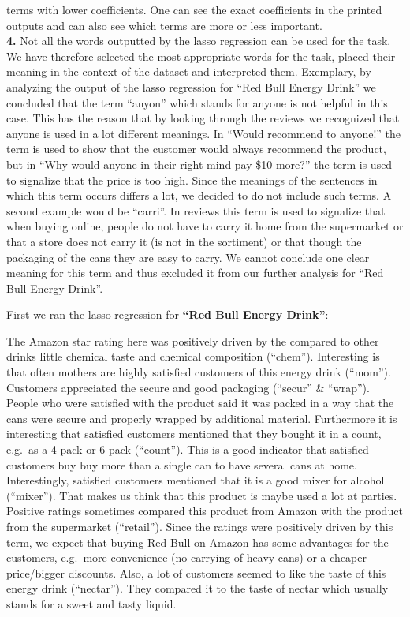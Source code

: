 \documentclass[
]{article}
\begin{document}
terms with lower coefficients. One can see the exact coefficients in the
printed outputs and can also see which terms are more or less
important.\\
\textbf{4.} Not all the words outputted by the lasso regression can be
used for the task. We have therefore selected the most appropriate words
for the task, placed their meaning in the context of the dataset and
interpreted them. Exemplary, by analyzing the output of the lasso
regression for ``Red Bull Energy Drink'' we concluded that the term
``anyon'' which stands for anyone is not helpful in this case. This has
the reason that by looking through the reviews we recognized that anyone
is used in a lot different meanings. In ``Would recommend to anyone!''
the term is used to show that the customer would always recommend the
product, but in ``Why would anyone in their right mind pay \$10 more?''
the term is used to signalize that the price is too high. Since the
meanings of the sentences in which this term occurs differs a lot, we
decided to do not include such terms. A second example would be
``carri''. In reviews this term is used to signalize that when buying
online, people do not have to carry it home from the supermarket or that
a store does not carry it (is not in the sortiment) or that though the
packaging of the cans they are easy to carry. We cannot conclude one
clear meaning for this term and thus excluded it from our further
analysis for ``Red Bull Energy Drink''.

First we ran the lasso regression for \textbf{``Red Bull Energy
Drink''}:

The Amazon star rating here was positively driven by the compared to
other drinks little chemical taste and chemical composition (``chem'').
Interesting is that often mothers are highly satisfied customers of this
energy drink (``mom''). Customers appreciated the secure and good
packaging (``secur'' \& ``wrap''). People who were satisfied with the
product said it was packed in a way that the cans were secure and
properly wrapped by additional material. Furthermore it is interesting
that satisfied customers mentioned that they bought it in a count,
e.g.~as a 4-pack or 6-pack (``count''). This is a good indicator that
satisfied customers buy buy more than a single can to have several cans
at home. Interestingly, satisfied customers mentioned that it is a good
mixer for alcohol (``mixer''). That makes us think that this product is
maybe used a lot at parties. Positive ratings sometimes compared this
product from Amazon with the product from the supermarket (``retail'').
Since the ratings were positively driven by this term, we expect that
buying Red Bull on Amazon has some advantages for the customers,
e.g.~more convenience (no carrying of heavy cans) or a cheaper
price/bigger discounts. Also, a lot of customers seemed to like the
taste of this energy drink (``nectar''). They compared it to the taste
of nectar which usually stands for a sweet and tasty liquid.
\end{document}
